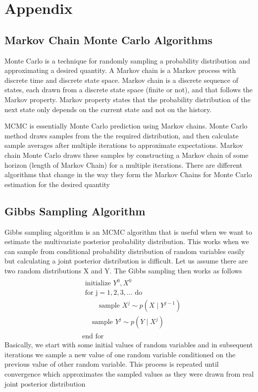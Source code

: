 \documentclass[11pt]{article}
\begin{document}
\section{Appendix}
\subsection{Markov Chain Monte Carlo Algorithms}

Monte Carlo is a technique for randomly sampling a probability distribution and approximating a desired quantity\cite{gibbsMarkov}. A Markov chain is a Markov process with discrete time and discrete state space. Markov chain is a discrete sequence of states, each drawn from a discrete state space (finite or not), and that follows the Markov property\cite{markov}. Markov property states that the probability distribution of the next state only depends on the current state and not on the history. 

MCMC is essentially Monte Carlo prediction using Markov chains. Monte Carlo method draws samples from the the required distribution, and then calculate sample averages after multiple iterations to approximate expectations. Markov chain Monte Carlo draws these samples by constructing a  Markov chain of some horizon (length of Markov Chain) for a multiple iterations. There are different algorithms that change in the way they form the Markov Chains for Monte Carlo estimation for the desired quantity \cite{gibbsMarkov}

\subsection{Gibbs Sampling Algorithm}
Gibbs sampling algorithm is an MCMC algorithm that is useful when we want to estimate the multivariate posterior probability distribution. This works when we can sample from conditional probability distribution of random variables easily but calculating a joint posterior distribution is difficult. Let us assume there are two random distributions X and Y. The Gibbs sampling then works as follows
\begin{equation}
\begin{aligned}
&\begin{array}{l}
\text { initialize } Y^{0}, X^{0} \\
\text { for } \mathrm{j}=1,2,3, \ldots \text { do } \\
\qquad \text { sample } X^{j} \sim p\left(X \mid Y^{j-1}\right) \\
\quad \text {\ \ \ \ sample } Y^{j} \sim p\left(Y \mid X^{j}\right)
\end{array}\\
&\text { end for }
\end{aligned}
\end{equation}
Basically, we start with some initial values of random variables and in subsequent iterations we sample a new value of one random variable conditioned on the previous value of other random variable. This process is repeated until convergence which approximates the sampled values as they were drawn from real joint posterior distribution \cite{gibbs}
\end{document}

